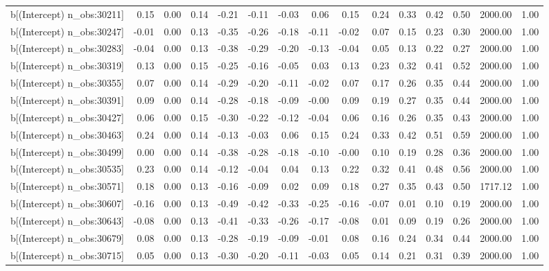 \begin{table}[ht]
\begin{tabular}{rrrrrrrrrrrrrrr}
  b[(Intercept) n\_obs:30211] & 0.15 & 0.00 & 0.14 & -0.21 & -0.11 & -0.03 & 0.06 & 0.15 & 0.24 & 0.33 & 0.42 & 0.50 & 2000.00 & 1.00 \\ 
  b[(Intercept) n\_obs:30247] & -0.01 & 0.00 & 0.13 & -0.35 & -0.26 & -0.18 & -0.11 & -0.02 & 0.07 & 0.15 & 0.23 & 0.30 & 2000.00 & 1.00 \\ 
  b[(Intercept) n\_obs:30283] & -0.04 & 0.00 & 0.13 & -0.38 & -0.29 & -0.20 & -0.13 & -0.04 & 0.05 & 0.13 & 0.22 & 0.27 & 2000.00 & 1.00 \\ 
  b[(Intercept) n\_obs:30319] & 0.13 & 0.00 & 0.15 & -0.25 & -0.16 & -0.05 & 0.03 & 0.13 & 0.23 & 0.32 & 0.41 & 0.52 & 2000.00 & 1.00 \\ 
  b[(Intercept) n\_obs:30355] & 0.07 & 0.00 & 0.14 & -0.29 & -0.20 & -0.11 & -0.02 & 0.07 & 0.17 & 0.26 & 0.35 & 0.44 & 2000.00 & 1.00 \\ 
  b[(Intercept) n\_obs:30391] & 0.09 & 0.00 & 0.14 & -0.28 & -0.18 & -0.09 & -0.00 & 0.09 & 0.19 & 0.27 & 0.35 & 0.44 & 2000.00 & 1.00 \\ 
  b[(Intercept) n\_obs:30427] & 0.06 & 0.00 & 0.15 & -0.30 & -0.22 & -0.12 & -0.04 & 0.06 & 0.16 & 0.26 & 0.35 & 0.43 & 2000.00 & 1.00 \\ 
  b[(Intercept) n\_obs:30463] & 0.24 & 0.00 & 0.14 & -0.13 & -0.03 & 0.06 & 0.15 & 0.24 & 0.33 & 0.42 & 0.51 & 0.59 & 2000.00 & 1.00 \\ 
  b[(Intercept) n\_obs:30499] & 0.00 & 0.00 & 0.14 & -0.38 & -0.28 & -0.18 & -0.10 & -0.00 & 0.10 & 0.19 & 0.28 & 0.36 & 2000.00 & 1.00 \\ 
  b[(Intercept) n\_obs:30535] & 0.23 & 0.00 & 0.14 & -0.12 & -0.04 & 0.04 & 0.13 & 0.22 & 0.32 & 0.41 & 0.48 & 0.56 & 2000.00 & 1.00 \\ 
  b[(Intercept) n\_obs:30571] & 0.18 & 0.00 & 0.13 & -0.16 & -0.09 & 0.02 & 0.09 & 0.18 & 0.27 & 0.35 & 0.43 & 0.50 & 1717.12 & 1.00 \\ 
  b[(Intercept) n\_obs:30607] & -0.16 & 0.00 & 0.13 & -0.49 & -0.42 & -0.33 & -0.25 & -0.16 & -0.07 & 0.01 & 0.10 & 0.19 & 2000.00 & 1.00 \\ 
  b[(Intercept) n\_obs:30643] & -0.08 & 0.00 & 0.13 & -0.41 & -0.33 & -0.26 & -0.17 & -0.08 & 0.01 & 0.09 & 0.19 & 0.26 & 2000.00 & 1.00 \\ 
  b[(Intercept) n\_obs:30679] & 0.08 & 0.00 & 0.13 & -0.28 & -0.19 & -0.09 & -0.01 & 0.08 & 0.16 & 0.24 & 0.34 & 0.44 & 2000.00 & 1.00 \\ 
  b[(Intercept) n\_obs:30715] & 0.05 & 0.00 & 0.13 & -0.30 & -0.20 & -0.11 & -0.03 & 0.05 & 0.14 & 0.21 & 0.31 & 0.39 & 2000.00 & 1.00 \\ 

\end{tabular}
\end{table}
